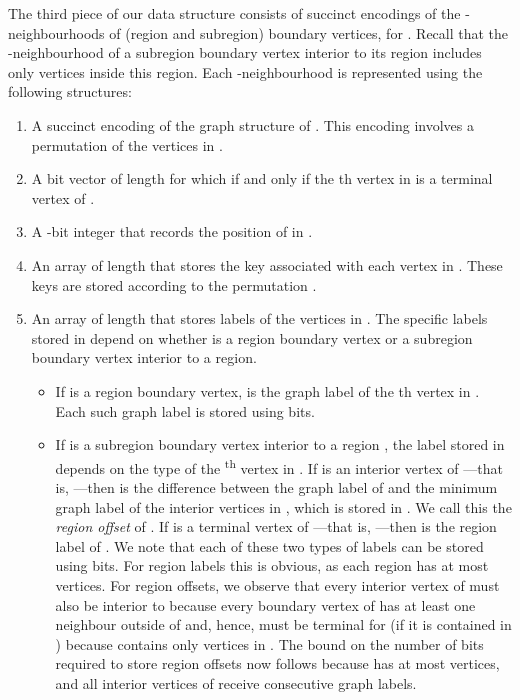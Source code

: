 The third piece of our data structure consists of succinct encodings
of the -neighbourhoods of (region and subregion) boundary
vertices, for .
Recall that the -neighbourhood of a subregion boundary vertex interior
to its region includes only vertices inside this region.
Each -neighbourhood  is represented using the
following structures:
\begin{enumerate}
\item A succinct encoding  of the graph structure of
  .
  This encoding involves a permutation  of the vertices in
  .
\item A bit vector  of length  for which
   if and only if the th vertex in  is a terminal
  vertex of .
\item A -bit integer  that records the position of
   in .
\item An array  of length  that stores the
  key associated with each vertex in .
  These keys are stored according to the permutation .
\item An array  of length  that stores
  labels of the vertices in .
  The specific labels stored in  depend on whether  is a region
  boundary vertex or a subregion boundary vertex interior to a region.
  \begin{itemize}
  \item If  is a region boundary vertex,  is the graph
    label of the th vertex in .
    Each such graph label is stored using  bits.
  \item If  is a subregion boundary vertex interior to a region
    , the label stored in  depends on the type of the
    \textsuperscript{th} vertex  in .
    If  is an interior vertex of ---that is,
    ---then  is the difference between the graph
    label of  and the minimum graph label of the interior vertices in
    ,  which is stored in .
    We call this the \emph{region offset} of .
    If  is a terminal vertex of ---that is,
    ---then  is the region label of .
    We note that each of these two types of labels can be stored using
     bits.
    For region labels this is obvious, as each region has at most 
    vertices.
    For region offsets, we observe that every interior vertex of
     must also be interior to  because every
    boundary vertex of  has at least one neighbour outside of
     and, hence, must be terminal for  (if it is
    contained in ) because  contains only
    vertices in .
    The bound on the number of bits required to store region offsets now
    follows because  has at most  vertices, and all interior
    vertices of  receive consecutive graph labels.
  \end{itemize}
\end{enumerate}

